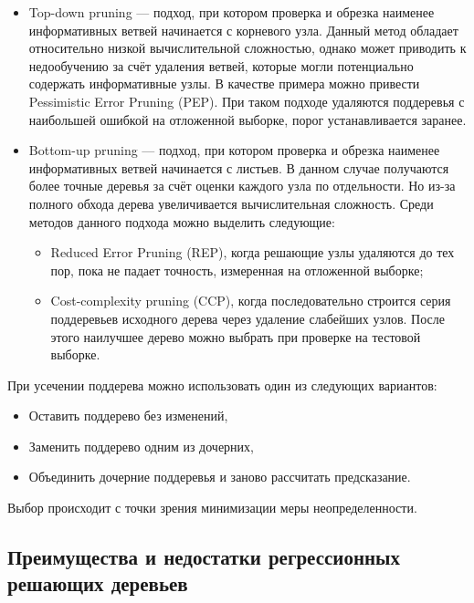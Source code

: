 \begin{itemize}
    \item Top-down pruning — подход, при котором проверка и обрезка наименее информативных ветвей начинается с корневого узла. Данный метод обладает относительно низкой вычислительной сложностью, однако может приводить к недообучению за счёт удаления ветвей, которые могли потенциально содержать информативные узлы. В качестве примера можно привести Pessimistic Error Pruning (PEP). При таком подходе удаляются поддеревья с наибольшей ошибкой на отложенной выборке, порог устанавливается заранее.
    
    \item Bottom-up pruning — подход, при котором проверка и обрезка наименее информативных ветвей начинается с листьев. В данном случае получаются более точные деревья за счёт оценки каждого узла по отдельности. Но из-за полного обхода дерева увеличивается вычислительная сложность. Среди методов данного подхода можно выделить следующие:
    \begin{itemize}
        \item Reduced Error Pruning (REP), когда решающие узлы удаляются до тех пор, пока не падает точность, измеренная на отложенной выборке;

        \item Cost-complexity pruning (CCP), когда последовательно строится серия поддеревьев исходного дерева через удаление слабейших узлов. После этого наилучшее дерево можно выбрать при проверке на тестовой выборке.
    \end{itemize}
\end{itemize}

При усечении поддерева можно использовать один из следующих вариантов:
\begin{itemize}
    \item Оставить поддерево без изменений,
    \item Заменить поддерево одним из дочерних,
    \item Объединить дочерние поддеревья и заново рассчитать предсказание.
\end{itemize}
Выбор происходит с точки зрения минимизации меры неопределенности.

\subsection{Преимущества и недостатки регрессионных решающих деревьев}

